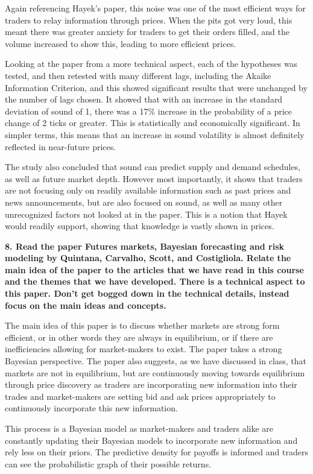 \documentclass[11pt]{article}
\begin{document}
Again referencing Hayek's paper, this noise was one of the most
efficient ways for traders to relay information through prices. When the
pits got very loud, this meant there was greater anxiety for traders to
get their orders filled, and the volume increased to show this, leading
to more efficient prices.

Looking at the paper from a more technical aspect, each of the
hypotheses was tested, and then retested with many different lags,
including the Akaike Information Criterion, and this showed significant
results that were unchanged by the number of lags chosen. It showed that
with an increase in the standard deviation of sound of 1, there was a
17\% increase in the probability of a price change of 2 ticks or
greater. This is statistically and economically significant. In simpler
terms, this means that an increase in sound volatility is almost
definitely reflected in near-future prices.

The study also concluded that sound can predict supply and demand
schedules, as well as future market depth. However most importantly, it
shows that traders are not focusing only on readily available
information such as past prices and news announcements, but are also
focused on sound, as well as many other unrecognized factors not looked
at in the paper. This is a notion that Hayek would readily support,
showing that knowledge is vastly shown in prices.

    \textbf{8. Read the paper Futures markets, Bayesian forecasting and risk
modeling by Quintana, Carvalho, Scott, and Costigliola. Relate the main
idea of the paper to the articles that we have read in this course and
the themes that we have developed. There is a technical aspect to this
paper. Don't get bogged down in the technical details, instead focus on
the main ideas and concepts.}

    The main idea of this paper is to discuss whether markets are strong
form efficient, or in other words they are always in equilibrium, or if
there are inefficiencies allowing for market-makers to exist. The paper
takes a strong Bayesian perspective. The paper also suggests, as we have
discussed in class, that markets are not in equilibrium, but are
continuously moving towards equilibrium through price discovery as
traders are incorporating new information into their trades and
market-makers are setting bid and ask prices appropriately to
continuously incorporate this new information.

This process is a Bayesian model as market-makers and traders alike are
constantly updating their Bayesian models to incorporate new information
and rely less on their priors. The predictive density for payoffs is
informed and traders can see the probabilistic graph of their possible
returns.
\end{document}
